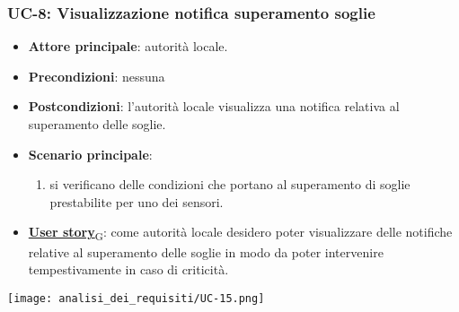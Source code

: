 \subsubsection{UC-8: Visualizzazione notifica superamento soglie}
\begin{itemize}
	\item \textbf{Attore principale}: autorità locale.
	\item \textbf{Precondizioni}: nessuna
	\item \textbf{Postcondizioni}: l'autorità locale visualizza una notifica relativa al superamento delle soglie.
	\item \textbf{Scenario principale}:
	      \begin{enumerate}
		      \item si verificano delle condizioni che portano al superamento di soglie prestabilite per uno dei sensori.
	      \end{enumerate}
	\item \href{https://7last.github.io/docs/pb/documentazione-interna/glossario\#user-story}{\textbf{User story}\textsubscript{G}}:
	      come autorità locale desidero poter visualizzare delle notifiche relative al superamento delle soglie in modo da poter intervenire tempestivamente in caso di criticità.
\end{itemize}
\begin{center}
	\texttt{[image: analisi\_dei\_requisiti/UC-15.png]}
\end{center}

